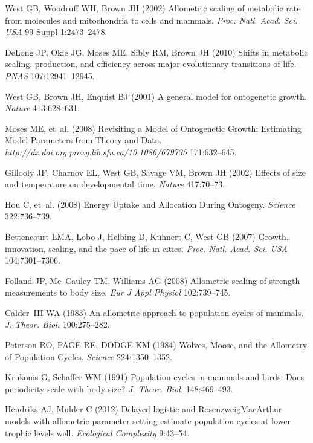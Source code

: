 \documentclass{pnastwo}
\begin{document}
\begin{article}
\begin{thebibliography}{10}
West GB, Woodruff WH, Brown JH
\newblock (2002) {Allometric scaling of metabolic rate from molecules and
  mitochondria to cells and mammals.}
\newblock \emph{Proc. Natl. Acad. Sci. USA} 99 Suppl 1:2473--2478.

DeLong JP, Okie JG, Moses ME, Sibly RM, Brown JH
\newblock (2010) {Shifts in metabolic scaling, production, and efficiency
  across major evolutionary transitions of life.}
\newblock \emph{PNAS} 107:12941--12945.

West GB, Brown JH, Enquist BJ
\newblock (2001) {A general model for ontogenetic growth}.
\newblock \emph{Nature} 413:628--631.

Moses ME, {et~al.}
\newblock (2008) {Revisiting a Model of Ontogenetic Growth: Estimating Model
  Parameters from Theory and Data}.
\newblock \emph{http://dx.doi.org.proxy.lib.sfu.ca/10.1086/679735}
  171:632--645.

Gillooly JF, Charnov EL, West GB, Savage VM, Brown JH
\newblock (2002) {Effects of size and temperature on developmental time}.
\newblock \emph{Nature} 417:70--73.

Hou C, {et~al.}
\newblock (2008) {Energy Uptake and Allocation During Ontogeny}.
\newblock \emph{Science} 322:736--739.

Bettencourt LMA, Lobo J, Helbing D, Kuhnert C, West GB
\newblock (2007) {Growth, innovation, scaling, and the pace of life in cities}.
\newblock \emph{Proc. Natl. Acad. Sci. USA} 104:7301--7306.

Folland JP, Mc~Cauley TM, Williams AG
\newblock (2008) {Allometric scaling of strength measurements to body size}.
\newblock \emph{Eur J Appl Physiol} 102:739--745.

Calder~III WA
\newblock (1983) {An allometric approach to population cycles of mammals}.
\newblock \emph{J. Theor. Biol.} 100:275--282.

Peterson RO, PAGE RE, DODGE KM
\newblock (1984) {Wolves, Moose, and the Allometry of Population Cycles}.
\newblock \emph{Science} 224:1350--1352.

Krukonis G, Schaffer WM
\newblock (1991) {Population cycles in mammals and birds: Does periodicity
  scale with body size?}
\newblock \emph{J. Theor. Biol.} 148:469--493.

Hendriks AJ, Mulder C
\newblock (2012) {Delayed logistic and Rosenzweig{\textendash}MacArthur models
  with allometric parameter setting estimate population cycles at lower trophic
  levels well}.
\newblock \emph{Ecological Complexity} 9:43--54.


\end{thebibliography}
\end{article}
\end{document}
